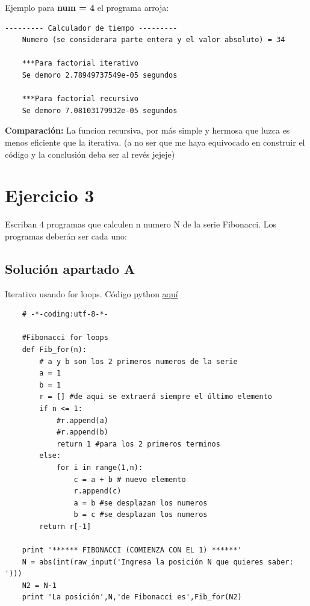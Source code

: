 \documentclass{article}
\begin{document}
     \noindent
    Ejemplo para \textbf{num = 4} el programa arroja:
    \begin{lstlisting}[style=C,numbers=none]
        --------- Calculador de tiempo ---------
    Numero (se considerara parte entera y el valor absoluto) = 34
    
    ***Para factorial iterativo
    Se demoro 2.78949737549e-05 segundos

    ***Para factorial recursivo
    Se demoro 7.08103179932e-05 segundos
    \end{lstlisting}
\textbf{Comparación:} La funcion recursiva, por más simple y hermosa que luzca es menos eficiente que la iterativa. (a no ser que me haya equivocado en construir el código y la conclusión deba ser al revés jejeje) 



\newpage 
\section{Ejercicio 3}
Escriban 4 programas que calculen  n numero N de la serie Fibonacci. Los programas deberán ser cada uno:
\subsection{Solución apartado A}
Iterativo usando for loops.
Código python \href{https://github.com/joescalona/Programacion-Astronomica/blob/master/Tarea\%205/problema3_A.py}{aquí}
    \begin{verbatim}
    # -*-coding:utf-8-*-

    #Fibonacci for loops
    def Fib_for(n):
    	# a y b son los 2 primeros numeros de la serie
    	a = 1
    	b = 1
    	r = [] #de aqui se extraerá siempre el último elemento
    	if n <= 1:
    		#r.append(a)
    		#r.append(b)
    		return 1 #para los 2 primeros terminos 
    	else:
    		for i in range(1,n):
    			c = a + b # nuevo elemento
    			r.append(c) 
    			a = b #se desplazan los numeros
    			b = c #se desplazan los numeros
    	return r[-1] 
    
    print '****** FIBONACCI (COMIENZA CON EL 1) ******'
    N = abs(int(raw_input('Ingresa la posición N que quieres saber: ')))
    N2 = N-1
    print 'La posición',N,'de Fibonacci es',Fib_for(N2)
    \end{verbatim}
    
\end{document}
